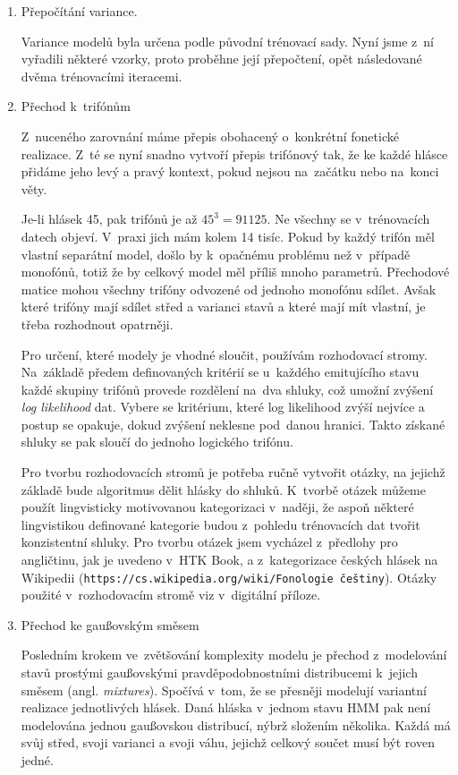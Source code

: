 \begin{enumerate}
\item{Přepočítání variance.}

Variance modelů byla určena podle původní trénovací sady. Nyní jsme z~ní
vyřadili některé vzorky, proto proběhne její přepočtení, opět následované dvěma
trénovacími iteracemi.

\item{Přechod k~trifónům}
\label{item:htktrain:triphones}

Z~nuceného zarovnání máme přepis obohacený o~konkrétní fonetické realizace. Z~té
se nyní snadno vytvoří přepis trifónový tak, že ke každé hlásce přidáme
jeho levý a pravý kontext, pokud nejsou na~začátku nebo na~konci věty.

Je-li hlásek 45, pak trifónů je až $45^3 = 91125$. Ne všechny se v~trénovacích
datech objeví. V~praxi jich mám kolem 14 tisíc. Pokud by každý trifón měl
vlastní separátní model, došlo by k~opačnému problému než v~případě monofónů,
totiž že by celkový model měl příliš mnoho parametrů. Přechodové matice mohou
všechny trifóny odvozené od jednoho monofónu sdílet. Avšak které trifóny
mají sdílet střed a varianci stavů a které mají mít vlastní, je třeba rozhodnout opatrněji.

Pro určení, které modely je vhodné sloučit, používám rozhodovací stromy.
Na~základě předem definovaných kritérií se u~každého emitujícího stavu každé
skupiny trifónů provede rozdělení na~dva shluky, což umožní zvýšení
\textit{log likelihood} dat. Vybere se kritérium, které log likelihood
zvýší nejvíce a postup se opakuje, dokud zvýšení neklesne pod~danou hranici.
Takto získané shluky se pak sloučí do jednoho logického trifónu.

Pro tvorbu rozhodovacích stromů je potřeba ručně vytvořit
otázky, na jejichž základě bude algoritmus dělit hlásky do shluků. K~tvorbě
otázek můžeme použít lingvisticky motivovanou kategorizaci v~naději, že aspoň
některé lingvistikou definované kategorie budou z~pohledu trénovacích dat tvořit
konzistentní shluky. Pro tvorbu otázek jsem vycházel z~předlohy pro
angličtinu, jak je uvedeno v~HTK Book, a z~kategorizace českých hlásek na Wikipedii
(\texttt{https://cs.wikipedia.org/wiki/Fonologie~češtiny}).
Otázky použité v~rozhodovacím stromě viz v~digitální příloze.

\item{Přechod ke gaußovským směsem}

Posledním krokem ve~zvětšování komplexity modelu je přechod z~modelování stavů
prostými gaußovskými pravděpodobnostními distribucemi k~jejich směsem
(angl. \textit{mixtures}). Spočívá v~tom, že se přesněji modelují variantní
realizace jednotlivých hlásek. Daná hláska v~jednom stavu HMM pak není modelována jednou gaußovskou
distribucí, nýbrž složením několika. Každá má svůj střed, svoji varianci a svoji
váhu, jejichž celkový součet musí být roven jedné.


\end{enumerate}
